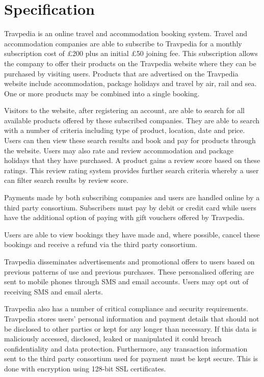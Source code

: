 \section{Specification}

Travpedia is an online travel and accommodation booking system. Travel and
accommodation companies are able to subscribe to Travpedia for a monthly
subscription cost of £200 plus an initial £50 joining fee.  This subscription
allows the company to offer their products on the Travpedia website where they
can be purchased by visiting users. Products that are advertised on the
Travpedia website include accommodation, package holidays and travel by air,
rail and sea. One or more products may be combined into a single booking.

Visitors to the website, after registering an account, are able to search for
all available products offered by these subscribed companies.  They are able to
search with a number of criteria including type of product, location, date and
price. Users can then view these search results and book and pay for products
through the website. Users may also rate and review accommodation and package
holidays that they have purchased. A product gains a review score based on
these ratings.  This review rating system provides further search criteria
whereby a user can filter search results by review score.

Payments made by both subscribing companies and users are handled online by a
third party consortium. Subscribers must pay by debit or credit card while
users have the additional option of paying with gift vouchers offered by
Travpedia.

Users are able to view bookings they have made and, where possible, cancel
these bookings and receive a refund via the third party consortium.

Travpedia disseminates advertisements and promotional offers to users based on
previous patterns of use and previous purchases. These personalised offering
are sent to mobile phones through SMS and email accounts.  Users may opt out of
receiving SMS and email alerts.

Travpedia also has a number of critical compliance and security requirements.
Travpedia stores users' personal information and payment details that should
not be disclosed to other parties or kept for any longer than necessary. If
this data is maliciously accessed, disclosed, leaked or manipulated it could
breach confidentiality and data protection.  Furthermore, any transaction
information sent to the third party consortium used for payment must be kept
secure. This is done with encryption using 128-bit SSL certificates.

